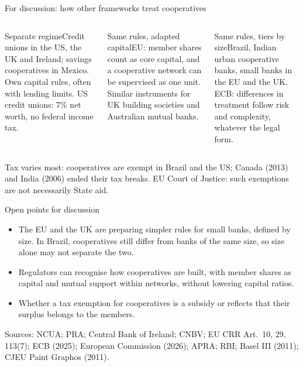 \documentclass[aspectratio=169,10pt]{beamer}
\newcommand{\card}[3]{\begin{block}{#2}\scriptsize #3\end{block}}%
\begin{document}
\begin{frame}{For discussion: how other frameworks treat cooperatives}
\vspace{0.1cm}
\begin{columns}[T]
\card{}{Separate regime}{Credit unions in the US, the UK and Ireland; savings cooperatives in Mexico. Own capital rules, often with lending limits. US credit unions: 7\% net worth, no federal income tax.}
\card{}{Same rules, adapted capital}{EU: member shares count as core capital, and a cooperative network can be supervised as one unit. Similar instruments for UK building societies and Australian mutual banks.}
\card{}{Same rules, tiers by size}{Brazil, Indian urban cooperative banks, small banks in the EU and the UK. ECB: differences in treatment follow risk and complexity, whatever the legal form.}
\end{columns}
\vspace{0.2cm}
{\footnotesize Tax varies most: cooperatives are exempt in Brazil and the US; Canada (2013) and India (2006) ended their tax breaks. EU Court of Justice: such exemptions are not necessarily State aid.\par}
\vspace{0.25cm}
\begin{block}{Open points for discussion}\footnotesize
\setlength{\leftmargini}{1em}\begin{itemize}\setlength{\itemsep}{2pt}
\item The EU and the UK are preparing simpler rules for small banks, defined by size. In Brazil, cooperatives still differ from banks of the same size, so size alone may not separate the two.
\item Regulators can recognise how cooperatives are built, with member shares as capital and mutual support within networks, without lowering capital ratios.
\item Whether a tax exemption for cooperatives is a subsidy or reflects that their surplus belongs to the members.
\end{itemize}
\end{block}
\vfill
{\tiny\color{muted}Sources: NCUA; PRA; Central Bank of Ireland; CNBV; EU CRR Art.~10, 29, 113(7); ECB (2025); European Commission (2026); APRA; RBI; Basel III (2011); CJEU Paint Graphos (2011).\par}

\end{frame}
\end{document}
